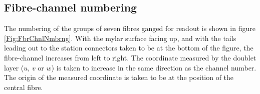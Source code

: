 
\subsection{Fibre-channel numbering}
\label{SubSect:SciFiFbrNmbrng}

The numbering of the groups of seven fibres ganged for readout is shown in figure \ref{Fig:FbrChnlNmbrng}. With the mylar surface facing up, and with the tails leading out to the station connectors taken to be at the bottom of the figure, the fibre-channel increases from left to right. The coordinate measured by the doublet layer ($u$, $v$ or $w$) is taken to increase in the same direction as the channel number. The origin of the measured coordinate is taken to be at the position of the central fibre.

